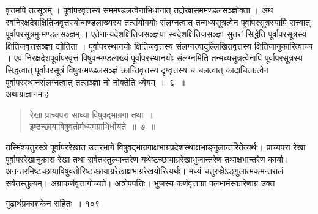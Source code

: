 \documentclass[11pt, openany]{book}
\begin{document}
\begin{sloppypar}
\noindent वृत्तमपि तत्सूत्रम् । पूर्वापरवृत्तस्य सममण्डलत्वेनाभिधानात् तद्रोखासममण्डलसञ्ज्ञोक्ता । अथ स्वनिरक्षदेशक्षितिजवृत्तस्योन्मण्डलाख्यस्य तत्संयोगयोः संलग्नत्वात् तन्मध्यसूत्रत्वेन पूर्वापरसूत्रस्यापि सत्त्वात् पूर्वापरसूत्रमुन्मण्डलसञ्ज्ञम् । एतेनान्यदेशक्षितिजसञ्ज्ञया स्वदेशक्षितिजसञ्ज्ञा सुतरां सिद्धेति पूर्वापरसूत्रस्य क्षितिजवृत्तसञ्ज्ञा द्योतिता । पूर्वापरस्थानयोः क्षितिजवृत्तस्य संलग्नत्वादुल्लिखितवृत्तस्य क्षितिजानुकारित्वाच्च । एवं निरक्षदेशपूर्वापरवृत्तं विषुवन्मण्डलाख्यं पूर्वापरस्थानयोः संलग्नमिति तन्मध्यसूत्रत्वेनापि पूर्वापरसूत्रस्य सिद्धत्वात् पूर्वापरसूत्रं विषुवन्मण्डलसञ्ज्ञं क्रान्तिवृत्तस्य दृग्वृत्तस्य च चलत्वात् कादाचित्कत्वेन पूर्वापरस्थानसंलग्नत्वात् तत्सञ्ज्ञा नो नोक्तेति ध्येयम्~॥~६~॥\\
\noindent अथाग्राज्ञानमाह\textendash
\end{sloppypar}
\begin{quote}

 {\ssi रेखा प्राच्यपरा साध्या विषुवद्भाग्रगा तथा~।\\
 इष्टच्छायाविषुवतोर्मध्यमग्राभिधीयते~॥~७~॥}
\end{quote}
\begin{sloppypar}
तस्मिंश्चतुरस्त्रे पूर्वापररेखात उत्तरभागे विषुवद्भाग्रगाक्षभाग्रप्रदेशस्थाक्षभाङ्गुलान्तरितेत्यर्थः। प्राच्यपरा रेखा पूर्वापररेखानुकारा रेखा तथा सर्वतस्तुल्यान्तरेण यथेष्टच्छायाग्ररेखाभुजान्तरेण तथाक्षभान्तरेण कार्या। अनन्तरमिष्टच्छायाविषुवतोरिष्टच्छायाग्ररेखाक्षभाग्ररेखयोरित्यर्थः। मध्यं चतुरस्रेऽङ्गुलात्मकमन्तरालं सर्वतस्तुल्यम्। अग्राकर्णवृत्तागोच्यते। अत्रोपपत्तिः। भुजस्य कर्णवृत्ताग्रा पलभामंस्कारेणाग्र उक्त\textendash
\end{sloppypar}

\newpage

\hspace{3cm} गुढार्थप्रकाशकेन सहितः~। \hfill १०९
\vspace{1cm}
\end{document}

